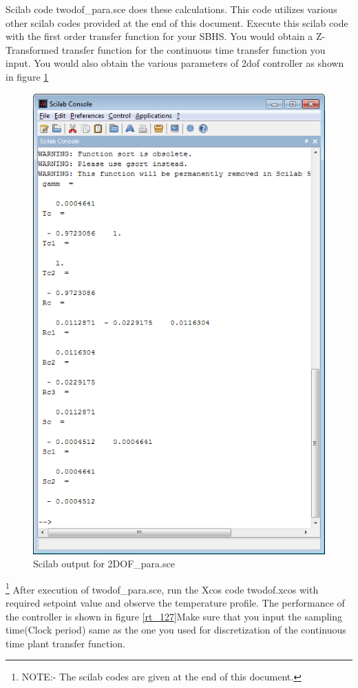 Scilab code {\ttfamily twodof\_para.sce} does these calculations.  This code utilizes various other scilab codes provided at the end of this document. Execute this scilab code with the first order transfer function for your SBHS. You would obtain a Z-Transformed transfer function for the continuous time transfer function you input. You would also obtain the various parameters of 2dof controller as shown in figure \ref{2-DOF_para}
\begin{figure}
\centering
\includegraphics[width=0.8\linewidth]{2-DOF_manual/2dof_console}
\caption{Scilab output for \ttfamily 2DOF\_para.sce}
\label{2-DOF_para}
\end{figure}
\footnote{ NOTE:- The scilab codes are given at the end of this document.}
After execution of {\ttfamily twodof\_para.sce}, run the Xcos code {\ttfamily twodof.xcos} with required setpoint value and observe the temperature profile. The performance of the controller is shown in figure \ref{rt_127}Make sure that you input the sampling time(Clock period) same as the one you used for discretization of the continuous time plant transfer function.
